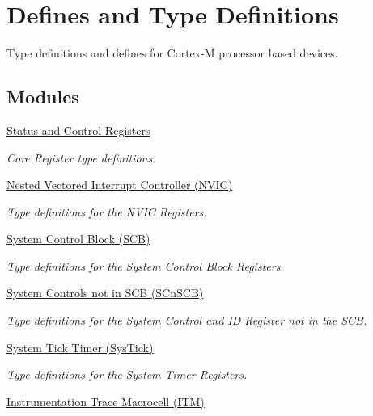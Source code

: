 \hypertarget{group__CMSIS__core__register}{\section{Defines and Type Definitions}
\label{group__CMSIS__core__register}
}


Type definitions and defines for Cortex-\/\-M processor based devices.  


\subsection*{Modules}
\begin{DoxyCompactItemize}
\item 
\hyperlink{group__CMSIS__CORE}{Status and Control Registers}
\begin{DoxyCompactList}\small\item\em Core Register type definitions. \end{DoxyCompactList}\item 
\hyperlink{group__CMSIS__NVIC}{Nested Vectored Interrupt Controller (\-N\-V\-I\-C)}
\begin{DoxyCompactList}\small\item\em Type definitions for the N\-V\-I\-C Registers. \end{DoxyCompactList}\item 
\hyperlink{group__CMSIS__SCB}{System Control Block (\-S\-C\-B)}
\begin{DoxyCompactList}\small\item\em Type definitions for the System Control Block Registers. \end{DoxyCompactList}\item 
\hyperlink{group__CMSIS__SCnSCB}{System Controls not in S\-C\-B (\-S\-Cn\-S\-C\-B)}
\begin{DoxyCompactList}\small\item\em Type definitions for the System Control and I\-D Register not in the S\-C\-B. \end{DoxyCompactList}\item 
\hyperlink{group__CMSIS__SysTick}{System Tick Timer (\-Sys\-Tick)}
\begin{DoxyCompactList}\small\item\em Type definitions for the System Timer Registers. \end{DoxyCompactList}\item 
\hyperlink{group__CMSIS__ITM}{Instrumentation Trace Macrocell (\-I\-T\-M)}

\end{DoxyCompactItemize}
